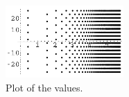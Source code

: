 {\begin{Solution}
\begin{enumerate}
    \begin{figure}[htbp!]
      \begin{center}
        \includegraphics[width=0.4\textwidth]{fcv/function/loglogi}
      \end{center}
      \caption{Plot of the values.}
      \label{loglogi}
    \end{figure}
  \end{enumerate}
\end{Solution}
}






